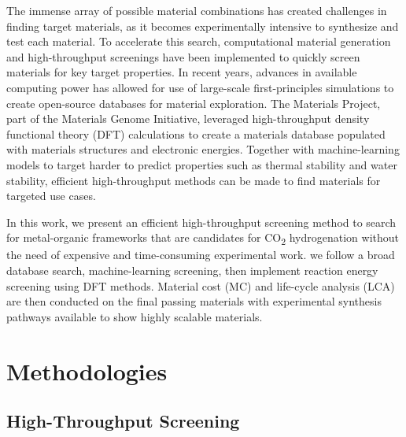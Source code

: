 \documentclass[twoside,twocolumn,9pt]{article}
\begin{document}
\par

The immense array of possible material combinations has created challenges in finding target materials, as it becomes experimentally intensive to synthesize and test each material. To accelerate this search, computational material generation and high-throughput screenings have been implemented to quickly screen materials for key target properties\cite{li_high-throughput_2016, hai_high-throughput_2022, liu_high-throughput_2025, tan_high_2025, kum_high-throughput_2025,khwaja_high-throughput_2024, anselmi_accelerating_2026, morandi_end--end_2026, hu_identifying_2025, wang_silico_2024}. In recent years, advances in available computing power has allowed for use of large-scale first-principles simulations to create open-source databases for material exploration. The Materials Project\cite{jain_commentary_2013, horton_accelerated_2025}, part of the Materials Genome Initiative\cite{de_pablo_materials_2014, de_pablo_new_2019}, leveraged high-throughput density functional theory (DFT) calculations to create a materials database populated with materials structures and electronic energies. Together with machine-learning models to target harder to predict properties such as thermal stability\cite{nandy_mofsimplify_2022} and water stability\cite{batra_prediction_2020, terrones_metalorganic_2024}, efficient high-throughput methods can be made to find materials for targeted use cases. 

\par

In this work, we present an efficient high-throughput screening method to search for metal-organic frameworks that are candidates for CO\textsubscript{2} hydrogenation without the need of expensive and time-consuming experimental work. we follow a broad database search, machine-learning screening, then implement reaction energy screening using DFT methods. Material cost (MC) and life-cycle analysis (LCA) are then conducted on the final passing materials with experimental synthesis pathways available to show highly scalable materials. 

\section{Methodologies}
\subsection{High-Throughput Screening}
\end{document}
